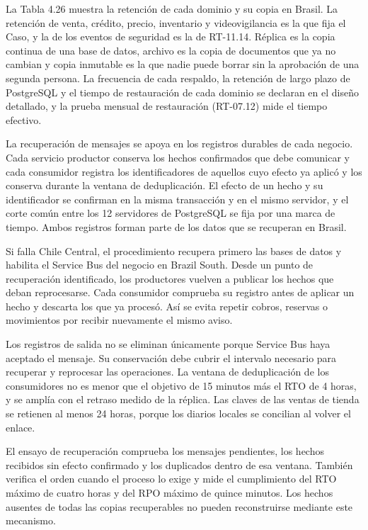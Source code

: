 \documentclass[11pt]{article}
\begin{document}
La Tabla 4.26 muestra la retención de cada dominio y su copia en Brasil. La retención de venta, crédito, precio, inventario y videovigilancia es la que fija el Caso, y la de los eventos de seguridad es la de RT-11.14. Réplica es la copia continua de una base de datos, archivo es la copia de documentos que ya no cambian y copia inmutable es la que nadie puede borrar sin la aprobación de una segunda persona. La frecuencia de cada respaldo, la retención de largo plazo de PostgreSQL y el tiempo de restauración de cada dominio se declaran en el diseño detallado, y la prueba mensual de restauración (RT-07.12) mide el tiempo efectivo.

La recuperación de mensajes se apoya en los registros durables de cada negocio. Cada servicio productor conserva los hechos confirmados que debe comunicar y cada consumidor registra los identificadores de aquellos cuyo efecto ya aplicó y los conserva durante la ventana de deduplicación. El efecto de un hecho y su identificador se confirman en la misma transacción y en el mismo servidor, y el corte común entre los 12 servidores de PostgreSQL se fija por una marca de tiempo. Ambos registros forman parte de los datos que se recuperan en Brasil.

Si falla Chile Central, el procedimiento recupera primero las bases de datos y habilita el Service Bus del negocio en Brazil South. Desde un punto de recuperación identificado, los productores vuelven a publicar los hechos que deban reprocesarse. Cada consumidor comprueba su registro antes de aplicar un hecho y descarta los que ya procesó. Así se evita repetir cobros, reservas o movimientos por recibir nuevamente el mismo aviso.

Los registros de salida no se eliminan únicamente porque Service Bus haya aceptado el mensaje. Su conservación debe cubrir el intervalo necesario para recuperar y reprocesar las operaciones. La ventana de deduplicación de los consumidores no es menor que el objetivo de 15 minutos más el RTO de 4 horas, y se amplía con el retraso medido de la réplica. Las claves de las ventas de tienda se retienen al menos 24 horas, porque los diarios locales se concilian al volver el enlace.

El ensayo de recuperación comprueba los mensajes pendientes, los hechos recibidos sin efecto confirmado y los duplicados dentro de esa ventana. También verifica el orden cuando el proceso lo exige y mide el cumplimiento del RTO máximo de cuatro horas y del RPO máximo de quince minutos. Los hechos ausentes de todas las copias recuperables no pueden reconstruirse mediante este mecanismo.
\end{document}
